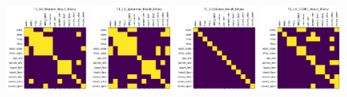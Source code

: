 \begin{figure}
    \includegraphics[width=0.24\textwidth]{chap6/figs/T1_1.0_Pearson_Result_Binary.png}
    \includegraphics[width=0.24\textwidth]{chap6/figs/T1_1.0_Spearman_Result_Binary.png}
    \includegraphics[width=0.24\textwidth]{chap6/figs/T1_1.0_Glasso_Result_Binary.png}
    \includegraphics[width=0.24\textwidth]{chap6/figs/T1_1.0_CODEC_Result_Binary.png}
    

\end{figure}
